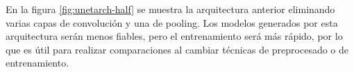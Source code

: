 
\pagebreak En la figura \ref{fig:unetarch-half} se muestra la arquitectura anterior eliminando varias capas de convolución y una de pooling. Los modelos generados por esta arquitectura serán menos fiables, pero el entrenamiento será más rápido, por lo que es útil para realizar comparaciones al cambiar técnicas de preprocesado o de entrenamiento.

